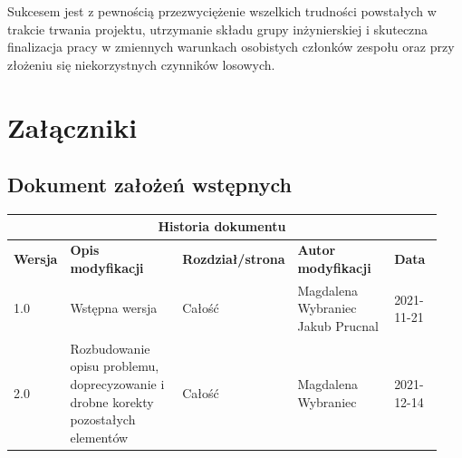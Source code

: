 \documentclass{sprz}
\begin{document}
Sukcesem jest z pewnością przezwyciężenie wszelkich trudności powstałych w trakcie trwania projektu, utrzymanie składu grupy inżynierskiej i skuteczna finalizacja pracy w zmiennych warunkach osobistych członków zespołu oraz przy złożeniu się niekorzystnych czynników losowych.


\chapter{Załączniki}


\section{Dokument założeń wstępnych}

\begin{documenttable}[]
\end{documenttable}
\begin{center}
  \begin{tabular}{ |p{0.1\linewidth}|p{0.28\linewidth}|p{0.2\linewidth}|p{0.24\linewidth}|p{0.12\linewidth}| }
    \hline
    \multicolumn{5}{|c|}{\textbf{Historia dokumentu}} \\
    \hline
    \textbf{Wersja} & \textbf{Opis modyfikacji} & \textbf{Rozdział/strona} & \textbf{Autor modyfikacji} & \textbf{Data}\\
    \hline
    {1.0} & {Wstępna wersja} & {Całość} & {Magdalena Wybraniec \newline Jakub Prucnal} & {2021-11-21}\\
    \hline
    {2.0} & {Rozbudowanie opisu problemu, doprecyzowanie i drobne korekty pozostałych elementów} &
    {Całość} & {Magdalena Wybraniec} & {2021-12-14}\\
    \hline
  \end{tabular}
\end{center}
\end{document}

